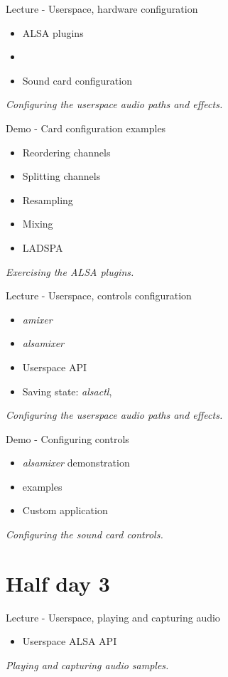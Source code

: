 \documentclass[a4paper,12pt,obeyspaces,spaces,hyphens]{article}
\begin{document}
\feagendatwocolumn
{Lecture - Userspace, hardware configuration}
{
  \begin{itemize}
  \item ALSA plugins
  \item {}
  \item Sound card configuration
  \end{itemize}
  \vspace{0.5em}
  {\em Configuring the userspace audio paths and effects.}
}
{Demo - Card configuration examples}
{
  \begin{itemize}
  \item Reordering channels
  \item Splitting channels
  \item Resampling
  \item Mixing
  \item LADSPA
  \end{itemize}
  \vspace{0.5em}
  {\em Exercising the ALSA plugins.}
}

\feagendatwocolumn
{Lecture - Userspace, controls configuration}
{
  \begin{itemize}
  \item {\em amixer}
  \item {\em alsamixer}
  \item Userspace API
  \item Saving state: {\em alsactl}, 
  \end{itemize}
  \vspace{0.5em}
  {\em Configuring the userspace audio paths and effects.}
}
{Demo - Configuring controls}
{
  \begin{itemize}
  \item {\em alsamixer} demonstration
  \item {} examples
  \item Custom application
  \end{itemize}
  \vspace{0.5em}
  {\em Configuring the sound card controls.}
}

\section{Half day 3}

\feagendaonecolumn
{Lecture - Userspace, playing and capturing audio}
{
  \begin{itemize}
  \item Userspace ALSA API
  \end{itemize}
  \vspace{0.5em}
  {\em Playing and capturing audio samples.}
}
\end{document}
